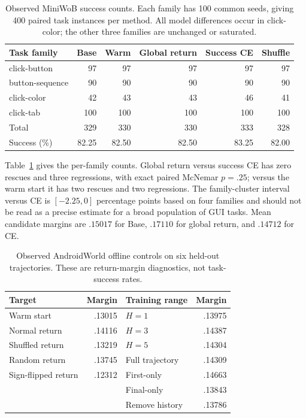 \documentclass{article}
\begin{document}
\begin{table}[h]
\caption{Observed MiniWoB success counts. Each family has 100 common seeds,
giving 400 paired task instances per method. All model differences occur in
click-color; the other three families are unchanged or saturated.}
\label{tab:miniwob}
\centering\small
\begin{tabular}{lrrrrr}
\toprule
Task family & Base & Warm & Global return & Success CE & Shuffle\\
\midrule
click-button &97&97&97&97&97\\
button-sequence &90&90&90&90&90\\
click-color &42&43&43&46&41\\
click-tab &100&100&100&100&100\\
\midrule
Total &329&330&330&333&328\\
Success (\%) &82.25&82.50&82.50&83.25&82.00\\
\bottomrule
\end{tabular}
\end{table}

Table~\ref{tab:miniwob} gives the per-family counts. Global return versus success
CE has zero rescues and three regressions, with
exact paired McNemar $p=.25$; versus the warm start it has two rescues and two
regressions. The family-cluster interval versus CE is $[-2.25,0]$ percentage
points based on four families and should not be read as a precise estimate for a
broad population of GUI tasks. Mean candidate margins are $.15017$ for Base,
$.17110$ for global return, and $.14712$ for CE.

\begin{table}[h]
\caption{Observed AndroidWorld offline controls on six held-out trajectories.
These are return-margin diagnostics, not task-success rates.}
\label{tab:android}
\centering\small
\begin{tabular}{lr@{\hspace{1cm}}lr}
\toprule
Target & Margin & Training range & Margin\\
\midrule
Warm start & .13015 & $H=1$ & .13975\\
Normal return & .14116 & $H=3$ & .14387\\
Shuffled return & .13219 & $H=5$ & .14304\\
Random return & .13745 & Full trajectory & .14309\\
Sign-flipped return & .12312 & First-only & .14663\\
 & & Final-only & .13843\\
 & & Remove history & .13786\\
\bottomrule
\end{tabular}
\end{table}
\end{document}
